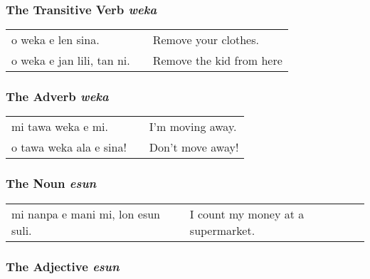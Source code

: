 \subsubsection*{The Transitive Verb \textit{weka}}
%

\begin{supertabular}{p{5,5cm}|ll}
    o weka e len sina.         &  & Remove your clothes.     \\
    o weka e jan lili, tan ni. &  & Remove the kid from here \\
\end{supertabular}

%
\subsubsection*{The Adverb \textit{weka}}
%

\begin{supertabular}{p{5,5cm}|ll}
    mi tawa weka e mi.      &  & I'm moving away. \\
    o tawa weka ala e sina! &  & Don't move away! \\
\end{supertabular}

%
%
%
%
\subsubsection*{The Noun \textit{esun}}
%

\begin{supertabular}{p{5,5cm}|ll}
    mi nanpa e mani mi, lon esun suli. &  & I count my money at a supermarket. \\
\end{supertabular}

%
%
\subsubsection*{The Adjective \textit{esun}}
%

